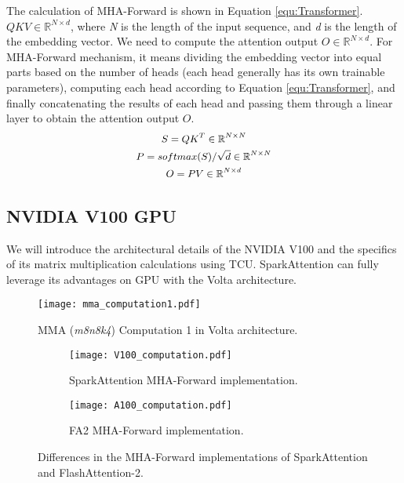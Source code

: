 \documentclass[10pt,twocolumn]{article}
\begin{document}
The calculation of MHA-Forward is shown in Equation \ref{equ:Transformer}. 
$QKV \in \mathbb{R}^{N \times d}$, where \textit{N} is the length of the input sequence, and \textit{d} is the length of the embedding vector. 
We need to compute the attention output $O \in \mathbb{R}^{N \times d}$. 
For MHA-Forward mechanism, it means dividing the embedding vector into equal parts based on the number of heads (each head generally has its own trainable parameters), computing each head according to Equation \ref{equ:Transformer}, and finally concatenating the results of each head and passing them through a linear layer to obtain the attention output $O$.
\begin{equation} \small \label{equ:Transformer}
\begin{gathered}
    S = QK^T \in \mathbb{R}^{N \times N}\\
    P = softmax(S)/\sqrt{d} \in \mathbb{R}^{N \times N}\\
    O = PV \in \mathbb{R}^{N \times d}\\
\end{gathered}
\end{equation}

\subsection{NVIDIA V100 GPU}

We will introduce the architectural details of the NVIDIA V100 and the specifics of its matrix multiplication calculations using TCU. 
SparkAttention can fully leverage its advantages on GPU with the Volta architecture.

\begin{figure}[htbp] \small
  \centering
  \texttt{[image: mma\_computation1.pdf]}
  \caption{MMA (\textit{m8n8k4}) Computation 1 in Volta architecture.}
  \label{fig:mma_computation1}%
\end{figure}
\begin{figure*}[htbp] \small
    \centering
    \begin{subfigure}[b]{0.45\textwidth}
        \texttt{[image: V100\_computation.pdf]}
        \caption{SparkAttention MHA-Forward implementation.}
    \end{subfigure}
    \hspace{0.0cm} %
    \begin{subfigure}[b]{0.4\textwidth}
        \texttt{[image: A100\_computation.pdf]}
        \vspace{2pt}
        \caption{FA2 MHA-Forward implementation.}
    \end{subfigure}
    \caption{Differences in the MHA-Forward implementations of SparkAttention and FlashAttention-2.}
    \label{fig:difference}
\end{figure*}
\end{document}
